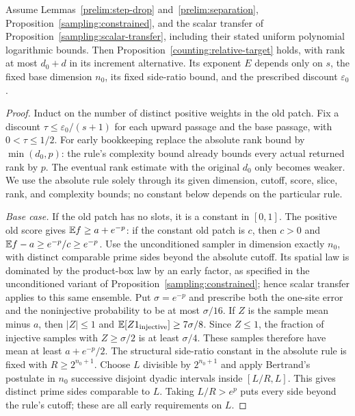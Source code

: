 \begin{theorem}
\label{lifting:relative-theorem}
Assume Lemmas~\ref{prelim:step-drop} and~\ref{prelim:separation},
Proposition~\ref{sampling:constrained}, and the scalar transfer of
Proposition~\ref{sampling:scalar-transfer}, including their stated
uniform polynomial logarithmic bounds.  Then
Proposition~\ref{counting:relative-target} holds, with rank at most
$d_0+d$ in its increment alternative.  Its exponent $E$ depends
only on $s$, the fixed base dimension $n_0$, its fixed side-ratio
bound, and the prescribed discount $\varepsilon_0$.
\end{theorem}

\begin{proof}
Induct on the number of distinct positive weights in the old patch.
Fix a discount $\tau\le\varepsilon_0/(s+1)$ for each upward passage
and the base passage, with $0<\tau\le1/2$.  For early bookkeeping
replace the absolute rank bound by $\min(d_0,p)$: the rule's
complexity bound already bounds every actual returned rank by $p$.
The eventual rank estimate with the original $d_0$ only becomes
weaker.  We use the absolute rule solely through its
given dimension, cutoff, score, slice, rank, and complexity bounds;
no constant below depends on the particular rule.

\emph{Base case.}
If the old patch has no slots, it is a constant in $[0,1]$.
The positive old score gives $\mathbb E f\ge a+e^{-p}$: if the constant
old patch is $c$, then $c>0$ and $\mathbb E f-a\ge e^{-p}/c\ge e^{-p}$.
Use the unconditioned sampler in dimension exactly $n_0$, with
distinct comparable prime sides beyond the absolute cutoff.  Its
spatial law is dominated by the product-box law by an early factor,
as specified in the unconditioned variant of
Proposition~\ref{sampling:constrained}; hence scalar transfer applies
to this same ensemble.
Put $\sigma=e^{-p}$ and prescribe both the one-site error and the
noninjective probability to be at most $\sigma/16$.  If $Z$ is the
sample mean minus $a$, then $|Z|\le1$ and
$\mathbb E[Z1_{\mathrm{injective}}]\ge7\sigma/8$.  Since $Z\le1$,
the fraction of injective samples with $Z\ge\sigma/2$ is at least
$\sigma/4$.  These samples therefore have mean at least
$a+e^{-p}/2$.  The structural side-ratio constant in the absolute
rule is fixed with $R\ge2^{n_0+1}$.  Choose $L$ divisible by
$2^{n_0+1}$ and apply Bertrand's postulate in $n_0$ successive
disjoint dyadic intervals inside $[L/R,L]$.  This gives distinct
prime sides comparable to $L$.  Taking $L/R>e^p$ puts every side
beyond the rule's cutoff; these are all early requirements on $L$.


\end{proof}
